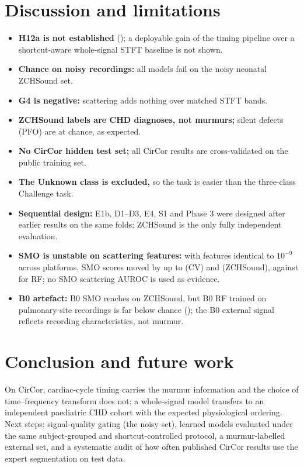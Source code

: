 \documentclass[conference]{IEEEtran}
\begin{document}
\section{Discussion and limitations}
\begin{itemize}\setlength\itemsep{1pt}
\item \textbf{H12a is not established} (); a deployable gain of the timing pipeline over a
shortcut-aware whole-signal STFT baseline is not shown.
\item \textbf{Chance on noisy recordings:} all models fail on the noisy neonatal ZCHSound set.
\item \textbf{G4 is negative:} scattering adds nothing over matched STFT bands.
\item \textbf{ZCHSound labels are CHD diagnoses, not murmurs;} silent defects (PFO) are at chance, as expected.
\item \textbf{No CirCor hidden test set;} all CirCor results are cross-validated on the public training set.
\item \textbf{The Unknown class is excluded,} so the task is easier than the three-class Challenge task.
\item \textbf{Sequential design:} E1b, D1--D3, E4, S1 and Phase 3 were designed after earlier results on the same folds;
ZCHSound is the only fully independent evaluation.
\item \textbf{SMO is unstable on scattering features:} with features identical to $10^{-9}$ across platforms, SMO scores moved
by up to  (CV) and  (ZCHSound), against  for RF; no SMO
scattering AUROC is used as evidence.
\item \textbf{B0 artefact:} B0 SMO reaches  on ZCHSound, but B0 RF trained on pulmonary-site
recordings is far below chance (); the B0 external signal reflects recording characteristics, not murmur.
\end{itemize}

\section{Conclusion and future work}
On CirCor, cardiac-cycle timing carries the murmur information and the choice of time--frequency transform does not; a
whole-signal model transfers to an independent paediatric CHD cohort with the expected physiological ordering. Next steps:
signal-quality gating (the noisy set), learned models evaluated under the same subject-grouped and shortcut-controlled
protocol, a murmur-labelled external set, and a systematic audit of how often published CirCor results use the expert
segmentation on test data.
\end{document}
